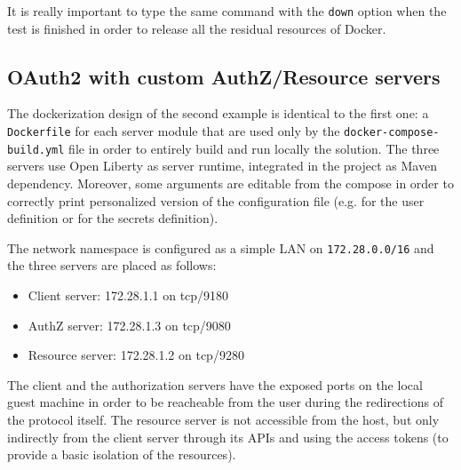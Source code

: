 It is really important to type the same command with the \texttt{down} option when the test is finished in order to release all the residual resources of Docker.

\subsection{OAuth2 with custom AuthZ/Resource servers}
The dockerization design of the second example is identical to the first one: a \texttt{Dockerfile} for each server module that are used only by the \texttt{docker-compose-build.yml} file in order to entirely build and run locally the solution. The three servers use Open Liberty as server runtime, integrated in the project as Maven dependency. Moreover, some arguments are editable from the compose in order to correctly print personalized version of the configuration file (e.g. for the user definition or for the secrets definition).

The network namespace is configured as a simple LAN on \texttt{172.28.0.0/16} and the three servers are placed as follows:

\begin{itemize}
    \item Client server: 172.28.1.1 on tcp/9180
    \item AuthZ server: 172.28.1.3 on tcp/9080
    \item Resource server: 172.28.1.2 on tcp/9280
\end{itemize}

The client and the authorization servers have the exposed ports on the local guest machine in order to be reacheable from the user during the redirections of the protocol itself. The resource server is not accessible from the host, but only indirectly from the client server through its APIs and using the access tokens (to provide a basic isolation of the resources).

\label{docker}
